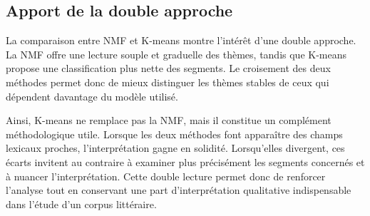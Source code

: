 \subsection{Apport de la double approche}

La comparaison entre NMF et K-means montre l'intérêt d'une double approche. La NMF offre une lecture souple et graduelle des thèmes, tandis que K-means propose une classification plus nette des segments. Le croisement des deux méthodes permet donc de mieux distinguer les thèmes stables de ceux qui dépendent davantage du modèle utilisé.

Ainsi, K-means ne remplace pas la NMF, mais il constitue un complément méthodologique utile. Lorsque les deux méthodes font apparaître des champs lexicaux proches, l'interprétation gagne en solidité. Lorsqu'elles divergent, ces écarts invitent au contraire à examiner plus précisément les segments concernés et à nuancer l'interprétation. Cette double lecture permet donc de renforcer l'analyse tout en conservant une part d'interprétation qualitative indispensable dans l'étude d'un corpus littéraire.